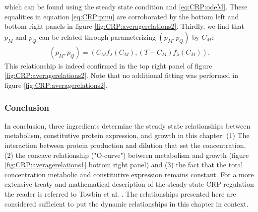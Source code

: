 which can be found using the steady state condition and \ref{eq:CRP:odeM}. These equalities in equation \ref{eq:CRP:pmu} are corroborated by the bottom left and bottom right panels in figure \ref{fig:CRP:averagerelations2}.
%
Thirdly, we find that $p_M$ and $p_Q$ can be related through parameterizing $(p_M, p_Q)$ by $C_M$:
%
\begin{align}
	\label{eq:CRP:pMpQ}	
	\left(p_M, p_Q\right) = 
	\left(C_M f_\lambda(C_M), (T-C_M) f_\lambda(C_M)\right)
	.
\end{align}
This relationship is indeed confirmed in the top right panel of figure \ref{fig:CRP:averagerelations2}.
%
Note that no additional fitting was performed in figure \ref{fig:CRP:averagerelations2}.

\subsubsection*{Conclusion}

In conclusion, three ingredients determine the steady state relationships between metabolism, constitutive protein expression, and growth in this chapter: 
(1) The interaction between protein production and dilution that set the concentration, 
(2) the concave relationship ("O-curve") between metabolism and growth (figure \ref{fig:CRP:averagerelations1} bottom right panel) and
(3) the fact that the total concentration metabolic and constitutive expression remains constant.
%
For a more extensive treaty and mathematical description of the steady-state CRP regulation the reader is referred to Towbin et al. \cite{Towbin2017}.
%
The relationships presented here are considered sufficient to put the dynamic relationships in this chapter in context.



